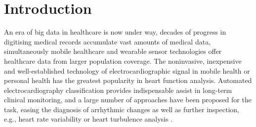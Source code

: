 \documentclass{bmcart}
\begin{document}
\begin{frontmatter}
\begin{abstractbox}

\begin{keyword}
\end{keyword}


\end{abstractbox}
%

\end{frontmatter}



\section*{Introduction}

An era of big data in healthcare is now under way, decades of progress in digitising medical records accumulate vast amounts of medical data, simultaneously mobile healthcare and wearable sensor technologies offer healthcare data from larger population coverage.
The noninvasive, inexpensive and well-established technology of electrocardiographic signal in mobile health or personal health has the greatest popularity in heart function analysis.
Automated electrocardiography classification provides indispensable assist in long-term clinical monitoring, and a large number of approaches have been proposed for the task, easing the diagnosis of arrhythmic changes as well as further inspection, e.g., heart rate variability or heart turbulence analysis \cite{mar}. 
\end{document}

